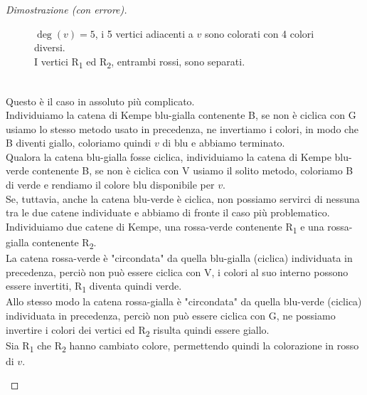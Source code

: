 \documentclass[a4paper,12pt,titlepage]{report}
\begin{document}
\begin{proof}[Dimostrazione (con errore)]
\begin{enumerate}
\begin{description}
\begin{figure}[h]
        			\vspace{0.5cm}
        			\caption{$\deg(v) = 5$, i 5 vertici adiacenti a $v$ sono colorati con 4 colori diversi. \\I vertici R\textsubscript{1} ed R\textsubscript{2}, entrambi rossi, sono separati.}
        		\end{figure}
        		\\Questo è il caso in assoluto più complicato.
        		\\Individuiamo la catena di Kempe blu-gialla contenente B, se non è ciclica con G usiamo lo stesso metodo usato in precedenza, ne invertiamo i colori, in modo che B diventi giallo, coloriamo quindi $v$ di blu e abbiamo terminato.
        		\\Qualora la catena blu-gialla fosse ciclica, individuiamo la catena di Kempe blu-verde contenente B, se non è ciclica con V usiamo il solito metodo, coloriamo B di verde e rendiamo il colore blu disponibile per $v$.
        		\\Se, tuttavia, anche la catena blu-verde è ciclica, non possiamo servirci di nessuna tra le due catene individuate e abbiamo di fronte il caso più problematico.
        		\\Individuiamo due catene di Kempe, una rossa-verde contenente R\textsubscript{1} e una rossa-gialla contenente R\textsubscript{2}.
        		\\La catena rossa-verde è "circondata" da quella blu-gialla (ciclica) individuata in precedenza, perciò non può essere ciclica con V, i colori al suo interno possono essere invertiti, R\textsubscript{1} diventa quindi verde.
        		\\Allo stesso modo la catena rossa-gialla è "circondata" da quella blu-verde (ciclica) individuata in precedenza, perciò non può essere ciclica con G, ne possiamo invertire i colori dei vertici ed R\textsubscript{2} risulta quindi essere giallo.
        		\\Sia R\textsubscript{1} che R\textsubscript{2} hanno cambiato colore, permettendo quindi la colorazione in rosso di $v$.
        		\vspace{-1.3cm}
        		\begin{figure}[h!]
        			\centering
\end{figure}
\end{description}
\end{enumerate}
\end{proof}
\end{document}
